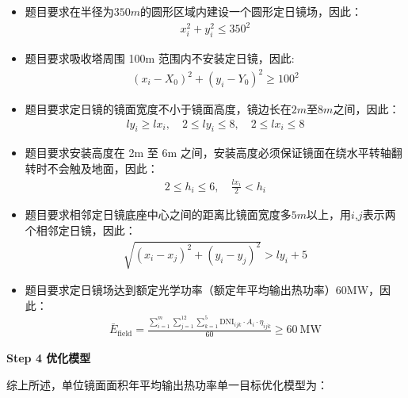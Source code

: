 \documentclass[../main.tex]{subfiles}
\begin{document}
\begin{itemize}
    \item 题目要求在半径为$350m$的圆形区域内建设一个圆形定日镜场，因此：
  \begin{align}\label{2.3}
x_i^2 + y_i^2 \leq 350^2
  \end{align}
    \item 题目要求吸收塔周围 100m 范围内不安装定日镜，因此:
      \begin{align}\label{2.4}
(x_i - X_0)^2 + (y_i - Y_0)^2 \geq 100^2
  \end{align}
    \item 题目要求定日镜的镜面宽度不小于镜面高度，镜边长在$2m$至$8m$之间，因此：
      \begin{align}\label{2.5}
ly_i \geq lx_{i}, \quad 2 \leq ly_i\leq 8, \quad 2 \leq lx_i \leq 8
  \end{align}
    \item 题目要求安装高度在 2m 至 6m 之间，安装高度必须保证镜面在绕水平转轴翻转时不会触及地面，因此：     
     \begin{align}\label{2.6}
2 \leq h_i \leq 6, \quad \frac{lx_i}{2} < h_i
  \end{align}
    \item 题目要求相邻定日镜底座中心之间的距离比镜面宽度多$5m$以上，用$i$,$j$表示两个相邻定日镜，因此：     
      \begin{align}\label{2.7}
\sqrt{(x_i - x_j)^2 + (y_i - y_j)^2} > ly_i + 5
  \end{align}
\item 题目要求定日镜场达到额定光学功率（额定年平均输出热功率）60MW，因此：       
 \begin{align}\label{2.8}
\bar{E}_{\text{field}} = \frac{\sum_{i=1}^{m} \sum_{j=1}^{12} \sum_{k=1}^{5} \text{DNI}_{ijk} \cdot A_i \cdot \eta_{ijk}}{60} \geq 60\ \text{MW}
  \end{align}
 
\end{itemize}
\noindent \textbf{Step 4 优化模型}
\par 综上所述，单位镜面面积年平均输出热功率单一目标优化模型为：
\end{document}
